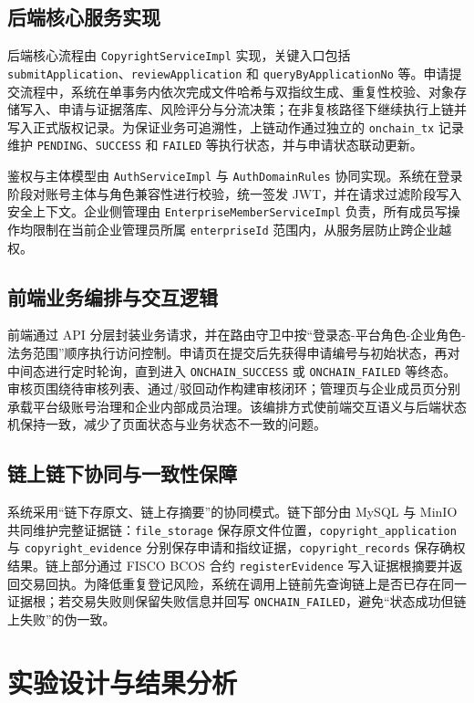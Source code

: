 \documentclass[UTF8,a4paper,zihao=5]{ctexart}
\newcommand{\code}[1]{\allowbreak\texttt{#1}\allowbreak}
\begin{document}
\subsection{后端核心服务实现}
后端核心流程由 \code{CopyrightServiceImpl} 实现，关键入口包括 \code{submitApplication}、\code{reviewApplication} 和 \code{queryByApplicationNo} 等。申请提交流程中，系统在单事务内依次完成文件哈希与双指纹生成、重复性校验、对象存储写入、申请与证据落库、风险评分与分流决策；在非复核路径下继续执行上链并写入正式版权记录。为保证业务可追溯性，上链动作通过独立的 \code{onchain\_tx} 记录维护 \code{PENDING}、\code{SUCCESS} 和 \code{FAILED} 等执行状态，并与申请状态联动更新。

鉴权与主体模型由 \code{AuthServiceImpl} 与 \code{AuthDomainRules} 协同实现。系统在登录阶段对账号主体与角色兼容性进行校验，统一签发 JWT，并在请求过滤阶段写入安全上下文。企业侧管理由 \code{EnterpriseMemberServiceImpl} 负责，所有成员写操作均限制在当前企业管理员所属 \code{enterpriseId} 范围内，从服务层防止跨企业越权。

\subsection{前端业务编排与交互逻辑}
前端通过 API 分层封装业务请求，并在路由守卫中按“登录态-平台角色-企业角色-法务范围”顺序执行访问控制。申请页在提交后先获得申请编号与初始状态，再对中间态进行定时轮询，直到进入 \code{ONCHAIN\_SUCCESS} 或 \code{ONCHAIN\_FAILED} 等终态。审核页围绕待审核列表、通过/驳回动作构建审核闭环；管理页与企业成员页分别承载平台级账号治理和企业内部成员治理。该编排方式使前端交互语义与后端状态机保持一致，减少了页面状态与业务状态不一致的问题。

\subsection{链上链下协同与一致性保障}
系统采用“链下存原文、链上存摘要”的协同模式。链下部分由 MySQL 与 MinIO 共同维护完整证据链：\code{file\_storage} 保存原文件位置，\code{copyright\_application} 与 \code{copyright\_evidence} 分别保存申请和指纹证据，\code{copyright\_records} 保存确权结果。链上部分通过 FISCO BCOS 合约 \code{registerEvidence} 写入证据根摘要并返回交易回执。为降低重复登记风险，系统在调用上链前先查询链上是否已存在同一证据根；若交易失败则保留失败信息并回写 \code{ONCHAIN\_FAILED}，避免“状态成功但链上失败”的伪一致。
\endgroup

\section{实验设计与结果分析}
\end{document}
